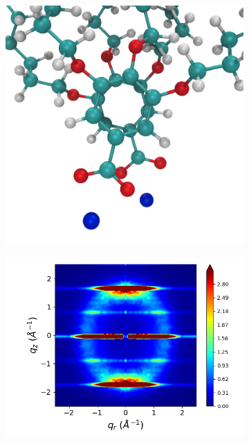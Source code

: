 \documentclass{article}
\begin{document}
\begin{figure}[htb]
\begin{subfigure}{0.3\linewidth}
	\label{fig:staggered}
  \end{subfigure}
  \begin{subfigure}{0.3\linewidth}
  	\centering
  	\includegraphics[width=\textwidth]{rotated_monomers.png}
  	\label{fig:rotated_monomers}
  \end{subfigure}
  \begin{subfigure}{0.3\linewidth}
  	\centering
  	\includegraphics[width=\textwidth]{rotated_carboxylate_rzplot_restrained.png}

\end{subfigure}
\end{figure}
\end{document}
